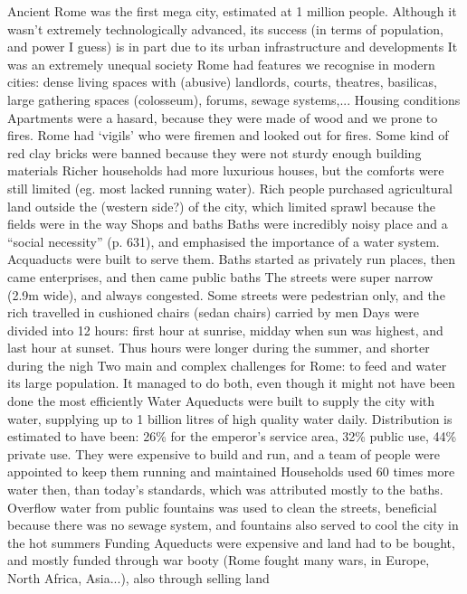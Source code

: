 \documentclass{article}
\begin{document}
\begin{outline}
	\1 Ancient Rome was the first mega city, estimated at 1 million people. Although it wasn't extremely technologically advanced, its success (in terms of population, and power I guess) is in part due to its urban infrastructure and developments
	\1 It was an extremely unequal society
	\1 Rome had features we recognise in modern cities: dense living spaces with (abusive) landlords, courts, theatres, basilicas, large gathering spaces (colosseum), forums, sewage systems,...
	\1 Housing conditions
		\2 Apartments were a hasard, because they were made of wood and we prone to fires. Rome had `vigils' who were firemen and looked out for fires. Some kind of red clay bricks were banned because they were not sturdy enough building materials
		\2 Richer households had more luxurious houses, but the comforts were still limited (eg. most lacked running water). Rich people purchased agricultural land outside the (western side?) of the city, which limited sprawl because the fields were in the way
	\1 Shops and baths
		\2 Baths were incredibly noisy place and a ``social necessity'' (p. 631), and emphasised the importance of a water system. Acquaducts were built to serve them. Baths started as privately run places, then came enterprises, and then came public baths
		\2 The streets were super narrow (2.9m wide), and always congested. Some streets were pedestrian only, and the rich travelled in cushioned chairs (sedan chairs) carried by men
		\2 Days were divided into 12 hours: first hour at sunrise, midday when sun was highest, and last hour at sunset. Thus hours were longer during the summer, and shorter during the nigh
	\1 Two main and complex challenges for Rome: to feed and water its large population. It managed to do both, even though it might not have been done the most efficiently
	\1 Water
		\2 Aqueducts were built to supply the city with water, supplying up to 1 billion litres of high quality water daily. Distribution is estimated to have been: 26\% for the emperor's service area, 32\% public use, 44\% private use. They were expensive to build and run, and a team of people were appointed to keep them running and maintained
		\2 Households used 60 times more water then, than today's standards, which was attributed mostly to the baths. Overflow water from public fountains was used to clean the streets, beneficial because there was no sewage system, and fountains also served to cool the city in the hot summers
	\1 Funding
		\2 Aqueducts were expensive and land had to be bought, and mostly funded through war booty (Rome fought many wars, in Europe, North Africa, Asia...), also through selling land

\end{outline}
\end{document}
